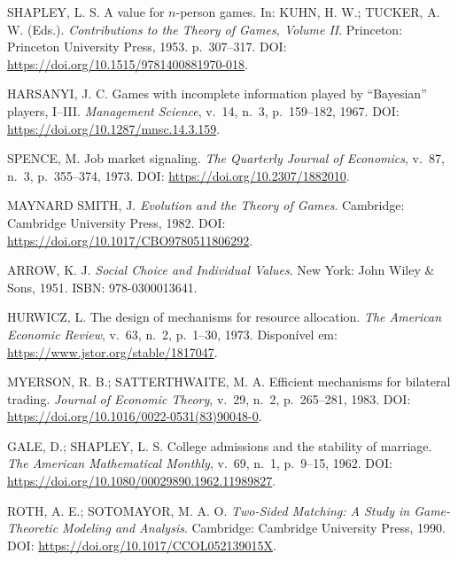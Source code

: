 \begin{enumerate}[{[1]}]
    \item \label{ref:shapley1953} SHAPLEY, L. S. A value for $n$-person games. In: KUHN, H. W.; TUCKER, A. W. (Eds.). \textit{Contributions to the Theory of Games, Volume II}. Princeton: Princeton University Press, 1953. p.~307--317. DOI: \url{https://doi.org/10.1515/9781400881970-018}.
    
    \item \label{ref:harsanyi1967} HARSANYI, J. C. Games with incomplete information played by ``Bayesian'' players, I--III. \textit{Management Science}, v.~14, n.~3, p.~159--182, 1967. DOI: \url{https://doi.org/10.1287/mnsc.14.3.159}.
    
    \item \label{ref:spence1973} SPENCE, M. Job market signaling. \textit{The Quarterly Journal of Economics}, v.~87, n.~3, p.~355--374, 1973. DOI: \url{https://doi.org/10.2307/1882010}.
    
    \item \label{ref:maynard1982} MAYNARD SMITH, J. \textit{Evolution and the Theory of Games}. Cambridge: Cambridge University Press, 1982. DOI: \url{https://doi.org/10.1017/CBO9780511806292}.
    
    \item \label{ref:arrow1951} ARROW, K. J. \textit{Social Choice and Individual Values}. New York: John Wiley \& Sons, 1951. ISBN: 978-0300013641.
    
    \item \label{ref:hurwicz1973} HURWICZ, L. The design of mechanisms for resource allocation. \textit{The American Economic Review}, v.~63, n.~2, p.~1--30, 1973. Disponível em: \url{https://www.jstor.org/stable/1817047}.
    
    \item \label{ref:myerson1983} MYERSON, R. B.; SATTERTHWAITE, M. A. Efficient mechanisms for bilateral trading. \textit{Journal of Economic Theory}, v.~29, n.~2, p.~265--281, 1983. DOI: \url{https://doi.org/10.1016/0022-0531(83)90048-0}.
    
    \item \label{ref:gale1962} GALE, D.; SHAPLEY, L. S. College admissions and the stability of marriage. \textit{The American Mathematical Monthly}, v.~69, n.~1, p.~9--15, 1962. DOI: \url{https://doi.org/10.1080/00029890.1962.11989827}.
    
    \item \label{ref:roth1990} ROTH, A. E.; SOTOMAYOR, M. A. O. \textit{Two-Sided Matching: A Study in Game-Theoretic Modeling and Analysis}. Cambridge: Cambridge University Press, 1990. DOI: \url{https://doi.org/10.1017/CCOL052139015X}.
    

\end{enumerate}

